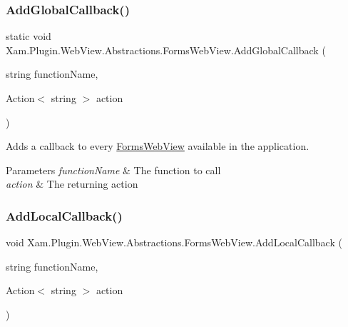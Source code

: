\subsubsection{\texorpdfstring{Add\+Global\+Callback()}{AddGlobalCallback()}}
{\footnotesize\ttfamily static void Xam.\+Plugin.\+Web\+View.\+Abstractions.\+Forms\+Web\+View.\+Add\+Global\+Callback (\begin{DoxyParamCaption}\item[{string}]{function\+Name,  }\item[{Action$<$ string $>$}]{action }\end{DoxyParamCaption})\hspace{0.3cm}{\ttfamily [static]}}



Adds a callback to every \hyperlink{class_xam_1_1_plugin_1_1_web_view_1_1_abstractions_1_1_forms_web_view}{Forms\+Web\+View} available in the application. 


\begin{DoxyParams}{Parameters}
{\em function\+Name} & The function to call\\
\hline
{\em action} & The returning action\\
\hline
\end{DoxyParams}
\mbox{\label{class_xam_1_1_plugin_1_1_web_view_1_1_abstractions_1_1_forms_web_view_a5b1fa9ce47383a6d375eab084e546f8e}} 
\subsubsection{\texorpdfstring{Add\+Local\+Callback()}{AddLocalCallback()}}
{\footnotesize\ttfamily void Xam.\+Plugin.\+Web\+View.\+Abstractions.\+Forms\+Web\+View.\+Add\+Local\+Callback (\begin{DoxyParamCaption}\item[{string}]{function\+Name,  }\item[{Action$<$ string $>$}]{action }\end{DoxyParamCaption})}



